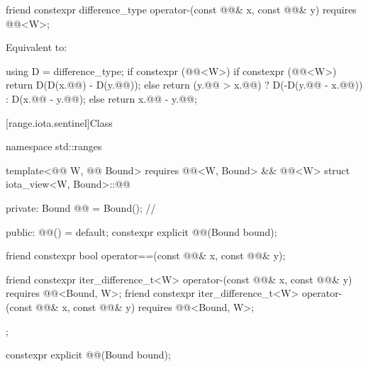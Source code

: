 \begin{itemdecl}
friend constexpr difference_type operator-(const @@& x, const @@& y)
  requires @@<W>;
\end{itemdecl}

\begin{itemdescr}
\pnum
\effects
Equivalent to:
\begin{codeblock}
using D = difference_type;
if constexpr (@@<W>) {
  if constexpr (@@<W>)
    return D(D(x.@@) - D(y.@@));
  else
    return (y.@@ > x.@@)
      ? D(-D(y.@@ - x.@@))
      : D(x.@@ - y.@@);
} else {
  return x.@@ - y.@@;
}
\end{codeblock}
\end{itemdescr}

[range.iota.sentinel]{Class }

\begin{codeblock}
namespace std::ranges {
  template<@@ W, @@ Bound>
    requires @@<W, Bound> && @@<W>
  struct iota_view<W, Bound>::@@ {
  private:
    Bound @@ = Bound();     // \expos

  public:
    @@() = default;
    constexpr explicit @@(Bound bound);

    friend constexpr bool operator==(const @@& x, const @@& y);

    friend constexpr iter_difference_t<W> operator-(const @@& x, const @@& y)
      requires @@<Bound, W>;
    friend constexpr iter_difference_t<W> operator-(const @@& x, const @@& y)
      requires @@<Bound, W>;
  };
}
\end{codeblock}

\begin{itemdecl}
constexpr explicit @@(Bound bound);
\end{itemdecl}

